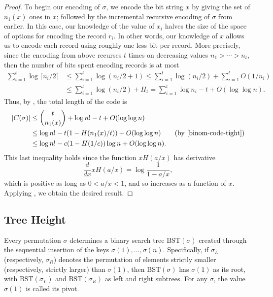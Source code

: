 \begin{proof}
  To begin our encoding of $\sigma$, we encode the bit string $x$ by
  giving the set of $n_1(x)$ ones in $x$; followed by the incremental
  recursive encoding of $\sigma$ from earlier. In this case, our
  knowledge of the value of $x_i$ halves the size of the space of
  options for encoding the record $r_i$. In other words, our knowledge
  of $x$ allows us to encode each record using roughly one less bit
  per record. More precisely, since the encoding from above recurses
  $t$ times on decreasing values $n_1 > \cdots > n_t$, then the number
  of bits spent encoding records is at most
  \begin{align*}
    \sum_{i = 1}^t \log \lceil n_i/2 \rceil &\leq \sum_{i = 1}^t \log (n_i/2 + 1)
                                              \leq \sum_{i = 1}^t \log (n_i/2) + \sum_{i = 1}^t O(1/n_i) \\
                                            &\leq \sum_{i = 1}^t \log (n_i/2) + H_t = \sum_{i = 1}^t \log n_i - t + O(\log \log n).
  \end{align*}
  Thus, by , the total length of the code is
  \begin{align*}
    |C(\sigma)| &\leq \binom{t}{n_1(x)} + \log n! - t + O(\log \log n) \\
                &\leq \log n! - t (1 - H(n_1(x)/t)) + O(\log \log n) \tag{by \eqref{binom-code-tight}}\\
                &\leq \log n! - c (1 - H(1/c))\log n + O(\log \log n).
  \end{align*}
  This last inequality holds since the function $x H(a/x)$ has
  derivative
  \[
  \frac{d}{d x} x H(a/x) = \log \frac{1}{1 - a/x},
  \]
  which is positive as long as $0 < a/x < 1$, and so increases as a
  function of $x$. Applying , we obtain the desired
  result.
\end{proof}

\subsection{Tree Height}

Every permutation $\sigma$ determines a binary search tree
$\text{BST}(\sigma)$ created through the sequential insertion of the
keys $\sigma(1), \ldots, \sigma(n)$. Specifically, if $\sigma_L$
(respectively, $\sigma_R$) denotes the permutation of elements
strictly smaller (respectively, strictly larger) than $\sigma(1)$,
then $\text{BST}(\sigma)$ has $\sigma(1)$ as its root, with
$\text{BST}(\sigma_L)$ and $\text{BST}(\sigma_R)$ as left and right
subtrees. For any $\sigma$, the value $\sigma(1)$ is called its pivot.

